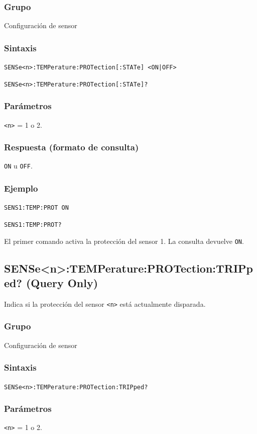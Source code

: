 \subsubsection*{Grupo}
Configuración de sensor

\subsubsection*{Sintaxis}
\texttt{SENSe<n>:TEMPerature:PROTection[:STATe] <ON|OFF>}\par
\texttt{SENSe<n>:TEMPerature:PROTection[:STATe]?}

\subsubsection*{Parámetros}
\texttt{<n>} = 1 o 2.

\subsubsection*{Respuesta (formato de consulta)}
\texttt{ON} u \texttt{OFF}.

\subsubsection*{Ejemplo}
\texttt{SENS1:TEMP:PROT ON}\par
\texttt{SENS1:TEMP:PROT?}

El primer comando activa la protección del sensor 1. La consulta devuelve
\texttt{ON}.

\subsection*{SENSe<n>:TEMPerature:PROTection:TRIPped? (Query Only)}

Indica si la protección del sensor \texttt{<n>} está actualmente disparada.

\subsubsection*{Grupo}
Configuración de sensor

\subsubsection*{Sintaxis}
\texttt{SENSe<n>:TEMPerature:PROTection:TRIPped?}

\subsubsection*{Parámetros}
\texttt{<n>} = 1 o 2.

